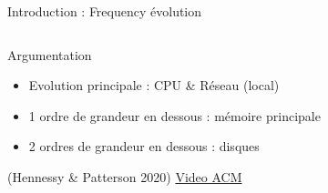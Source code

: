 \begin{Frame}{Introduction : Frequency évolution}
\begin{columns}[t]
\begin{column}{\BW}
\begin{block}{Argumentation}
\begin{itemize}
\item Evolution principale : CPU \& Réseau (local)
\item 1 ordre de grandeur en dessous : mémoire principale
\item 2 ordres de grandeur en dessous : disques
\end{itemize}
(Hennessy \& Patterson 2020) \href{https://www.youtube.com/watch?v=3LVeEjsn8Ts}{Video ACM}
\end{block}


\end{column}
\begin{column}{\BW}
\begin{block}{}
\end{block}

\end{column}

\end{columns}

\end{Frame}

